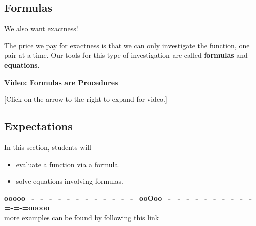 \documentclass{ximera}
\begin{document}
\subsection{Formulas}
We also want exactness!

The price we pay for exactness is that we can only investigate the function, one pair at a time.  Our tools for this type of investigation are called \textbf{formulas} and \textbf{equations}.








\begin{explanation} \textbf{Video: Formulas are Procedures}

[Click on the arrow to the right to expand for video.]
\begin{expandable} 

\begin{center}
\end{center}

\end{expandable}
\end{explanation}






\subsection{Expectations}

\begin{sectionOutcomes}
In this section, students will 

\begin{itemize}
\item evaluate a function via a formula.
\item solve equations involving formulas.
\end{itemize}
\end{sectionOutcomes}
















\begin{center}
\textbf{\textcolor{green!50!black}{ooooo=-=-=-=-=-=-=-=-=-=-=-=-=ooOoo=-=-=-=-=-=-=-=-=-=-=-=-=ooooo}} \\

more examples can be found by following this link\\ 

\end{center}
\end{document}
